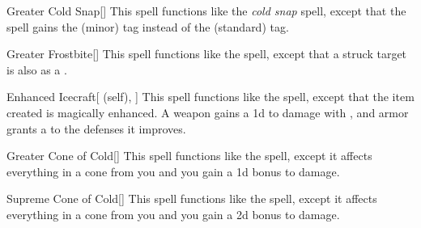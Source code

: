 \lowercase{\hypertarget{spell:Greater Cold Snap}{}}\label{spell:Greater Cold Snap}
\begin{apability}[\nth{3}]{\hypertarget{spell:Greater Cold Snap}{Greater Cold Snap}}[]
This spell functions like the \textit{cold snap} spell, except that the spell gains the  (minor) tag instead of the  (standard) tag.
\end{apability}
\vspace{0.25em}



\lowercase{\hypertarget{spell:Greater Frostbite}{}}\label{spell:Greater Frostbite}
\begin{apability}[\nth{3}]{\hypertarget{spell:Greater Frostbite}{Greater Frostbite}}[]
This spell functions like the  spell, except that a struck target is also  as a .
\end{apability}
\vspace{0.25em}



\lowercase{\hypertarget{spell:Enhanced Icecraft}{}}\label{spell:Enhanced Icecraft}
\begin{attuneability}[\nth{4}]{\hypertarget{spell:Enhanced Icecraft}{Enhanced Icecraft}}[ (self), ]
This spell functions like the  spell, except that the item created is magically enhanced.
A weapon gains a \plus1d  to damage with , and armor grants a   to the defenses it improves.
\end{attuneability}
\vspace{0.25em}



\lowercase{\hypertarget{spell:Greater Cone of Cold}{}}\label{spell:Greater Cone of Cold}
\begin{apability}[\nth{4}]{\hypertarget{spell:Greater Cone of Cold}{Greater Cone of Cold}}[]
This spell functions like the  spell, except it affects everything in a \arealarge cone from you and you gain a \plus1d bonus to damage.
\end{apability}
\vspace{0.25em}



\lowercase{\hypertarget{spell:Supreme Cone of Cold}{}}\label{spell:Supreme Cone of Cold}
\begin{apability}[\nth{7}]{\hypertarget{spell:Supreme Cone of Cold}{Supreme Cone of Cold}}[]
This spell functions like the  spell, except it affects everything in a \areahuge cone from you and you gain a \plus2d bonus to damage.
\end{apability}
\vspace{0.25em}


